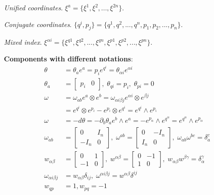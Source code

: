 \documentclass{article}
\begin{document}
\textit{Unified coordinates}. $\xi^a = \{\xi^1, \xi^2, ..., \xi^{2n}\}$.

\textit{Conjugate coordinates}. $\{q^i, p_j\} = \{q^1, q^2, ..., q^n, p_1, p_2, ..., p_n\}$.

\textit{Mixed index}. $\xi^{\alpha i } = \{\xi^{q1}, \xi^{q2}, ..., \xi^{qn}, \xi^{p1}, \xi^{p2}, ..., \xi^{pn}\}$.

\textbf{Components with different notations}:
\begin{equation}
\begin{aligned}
\theta &= \theta_a e^a = p_i e^{q^i} = \theta_{\alpha i} e^{\alpha i} \\
\theta_a &= \left[ \begin{matrix}
p_i & 0 \end{matrix} \right], \;  \theta_{qi} = p_i, \; \theta_{pi} = 0\\
\omega &= \omega_{ab} e^a \otimes e^b = \omega_{\alpha i \beta j} e^{\alpha i} \otimes e^{\beta j} \\
&= e^{q^i} \otimes e^{p_i} - e^{p_i} \otimes e^{q^i} = e^{q^i} \wedge e^{p_i} \\
\omega &= - d \theta = - \partial_b \theta_a e^b \wedge e^a = - e^{p_\alpha} \wedge e^{q^\alpha} = e^{q^\alpha} \wedge e^{p_\alpha} \\
\omega_{ab} &= \left[ \begin{matrix}
0 & I_n \\[2.2ex]
- I_n & 0 \end{matrix} \right] , \; 
\omega^{ab} = \left[ \begin{matrix}
0 & - I_n \\[2.2ex]
I_n & 0 \end{matrix} \right] , \;
\omega_{ab} \omega^{bc} = \delta_a^c \\
w_{\alpha \beta} &= \left[ \begin{matrix}
0 & 1 \\[2.2ex]
- 1 & 0 \end{matrix} \right], \;
w^{\alpha \beta} = \left[ \begin{matrix}
0 & -1 \\[2.2ex]
1 & 0 \end{matrix} \right], \; w_{\alpha\beta}w^{\beta\gamma} = \delta_\alpha^\gamma \\
\omega_{\alpha i \beta j} &= w_{\alpha \beta} \delta_{ij}, \;
\omega^{\alpha i \beta j} = w^{\alpha \beta} \delta^{ij} \\
w_{qp} &= 1, w_{pq} = -1
\end{aligned}
\end{equation}


%
%
\end{document}
